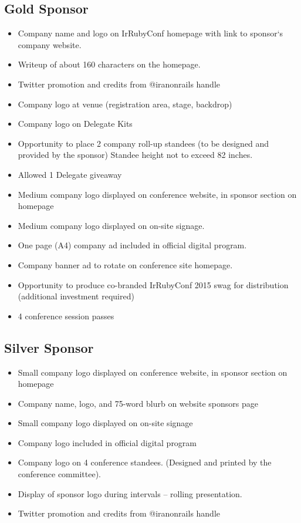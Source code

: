 \documentclass[a4paper,12pt]{article}
\begin{document}
\subsection*{Gold Sponsor}
\begin{itemize}

\item{Company name and logo on IrRubyConf homepage with link to sponsor`s
  company website.
}
\item{Writeup of about 160 characters on the homepage.}

\item{Twitter promotion and credits from @iranonrails handle}
\item{Company logo at venue (registration area, stage, backdrop)}
\item{Company logo on Delegate Kits}
\item{Opportunity to place 2 company roll-up standees (to be designed and
  provided by the sponsor) Standee height not to exceed 82 inches.}
\item{Allowed 1 Delegate giveaway}
\item{Medium company logo displayed on conference website, in sponsor section on homepage}
\item{Medium company logo displayed on on-site signage.}
\item{One page (A4) company ad included in official digital program.}
\item{Company banner ad to rotate on conference site homepage.}
\item{Opportunity to produce co-branded IrRubyConf 2015 swag for distribution (additional
  investment required)}
\item{4 conference session passes}

\end{itemize}


\subsection*{Silver Sponsor}
\label{subsec:label}
\begin{itemize}
\item{Small company logo displayed on conference website, in sponsor section on homepage}
\item{Company name, logo, and 75-word blurb on website sponsors page}
\item{Small company logo displayed on on-site signage}

\item{Company logo included in official digital program}
\item{Company logo on 4 conference standees. (Designed and printed by the conference committee).}
\item{Display of sponsor logo during intervals – rolling presentation.}
\item{Twitter promotion and credits from @iranonrails handle}

\end{itemize}
\end{document}
